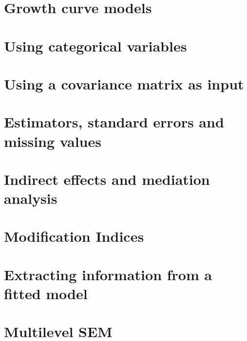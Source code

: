 \documentclass{article}
\begin{document}
\section{Growth curve models}

\section{Using categorical variables}

\section{Using a covariance matrix as input}

\section{Estimators, standard errors and missing values}

\section{Indirect effects and mediation analysis}

\section{Modification Indices}

\section{Extracting information from a fitted model}

\section{Multilevel SEM}

\end{document}
